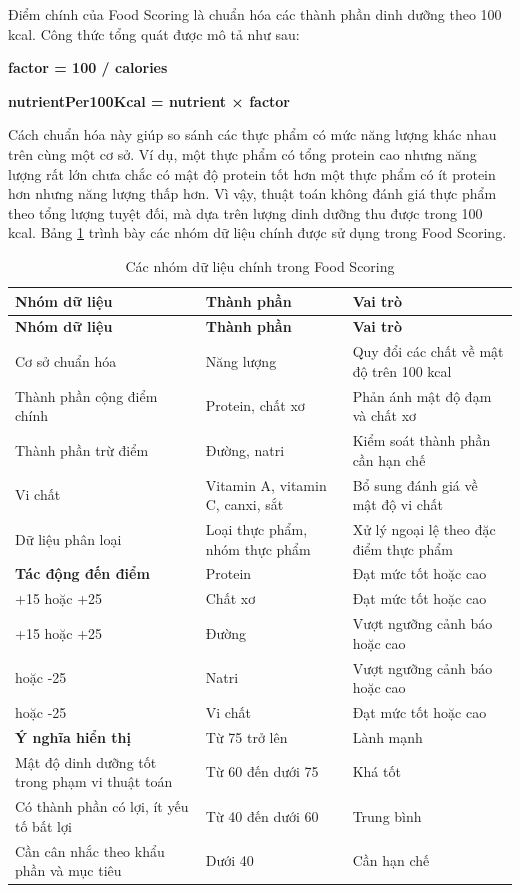 \documentclass[12pt, a4paper]{report}
\begin{document}
Điểm chính của Food Scoring là chuẩn hóa các thành phần dinh dưỡng theo 100 kcal. Công thức tổng quát được mô tả như sau:

\textbf{factor = 100 / calories}

\textbf{nutrientPer100Kcal = nutrient × factor}

Cách chuẩn hóa này giúp so sánh các thực phẩm có mức năng lượng khác nhau trên cùng một cơ sở. Ví dụ, một thực phẩm có tổng protein cao nhưng năng lượng rất lớn chưa chắc có mật độ protein tốt hơn một thực phẩm có ít protein hơn nhưng năng lượng thấp hơn. Vì vậy, thuật toán không đánh giá thực phẩm theo tổng lượng tuyệt đối, mà dựa trên lượng dinh dưỡng thu được trong 100 kcal. Bảng \ref{tab:food_scoring_data} trình bày các nhóm dữ liệu chính được sử dụng trong Food Scoring.

\begin{longtable}{|>{\raggedright\arraybackslash}p{4cm}|>{\raggedright\arraybackslash}p{4cm}|p{7cm}|}
\caption{Các nhóm dữ liệu chính trong Food Scoring}
\label{tab:food_scoring_data} \\
\hline
\textbf{Nhóm dữ liệu} & \textbf{Thành phần} & \textbf{Vai trò} \\
\hline
\endfirsthead
\hline
\textbf{Nhóm dữ liệu} & \textbf{Thành phần} & \textbf{Vai trò} \\
\hline
\endhead

Cơ sở chuẩn hóa & Năng lượng & Quy đổi các chất về mật độ trên 100 kcal \\
\hline
Thành phần cộng điểm chính & Protein, chất xơ & Phản ánh mật độ đạm và chất xơ \\
\hline
Thành phần trừ điểm & Đường, natri & Kiểm soát thành phần cần hạn chế \\
\hline
Vi chất & Vitamin A, vitamin C, canxi, sắt & Bổ sung đánh giá về mật độ vi chất \\
\hline
Dữ liệu phân loại & Loại thực phẩm, nhóm thực phẩm & Xử lý ngoại lệ theo đặc điểm thực phẩm \\
\hline
\textbf{Tác động đến điểm} & Protein & Đạt mức tốt hoặc cao \\
\hline
+15 hoặc +25 & Chất xơ & Đạt mức tốt hoặc cao \\
\hline
+15 hoặc +25 & Đường & Vượt ngưỡng cảnh báo hoặc cao \\
\hline
-10 hoặc -25 & Natri & Vượt ngưỡng cảnh báo hoặc cao \\
\hline
-10 hoặc -25 & Vi chất & Đạt mức tốt hoặc cao \\
\hline
\textbf{Ý nghĩa hiển thị} & Từ 75 trở lên & Lành mạnh \\
\hline
Mật độ dinh dưỡng tốt trong phạm vi thuật toán & Từ 60 đến dưới 75 & Khá tốt \\
\hline
Có thành phần có lợi, ít yếu tố bất lợi & Từ 40 đến dưới 60 & Trung bình \\
\hline
Cần cân nhắc theo khẩu phần và mục tiêu & Dưới 40 & Cần hạn chế \\
\hline
\end{longtable}
\end{document}
